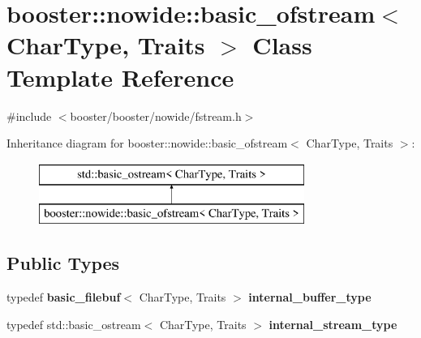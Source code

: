 \section{booster\+:\+:nowide\+:\+:basic\+\_\+ofstream$<$ Char\+Type, Traits $>$ Class Template Reference}
\label{classbooster_1_1nowide_1_1basic__ofstream}


{\ttfamily \#include $<$booster/booster/nowide/fstream.\+h$>$}

Inheritance diagram for booster\+:\+:nowide\+:\+:basic\+\_\+ofstream$<$ Char\+Type, Traits $>$\+:\begin{figure}[H]
\begin{center}
\leavevmode
\includegraphics[height=2.000000cm]{classbooster_1_1nowide_1_1basic__ofstream}
\end{center}
\end{figure}
\subsection*{Public Types}
\begin{DoxyCompactItemize}
\item 
typedef {\bf basic\+\_\+filebuf}$<$ Char\+Type, Traits $>$ {\bfseries internal\+\_\+buffer\+\_\+type}\label{classbooster_1_1nowide_1_1basic__ofstream_abb81c9368f20f17ace9841b4153723c8}

\item 
typedef std\+::basic\+\_\+ostream$<$ Char\+Type, Traits $>$ {\bfseries internal\+\_\+stream\+\_\+type}\label{classbooster_1_1nowide_1_1basic__ofstream_a4cf9219d4d52d5598ad7cf55c225d153}

\end{DoxyCompactItemize}
